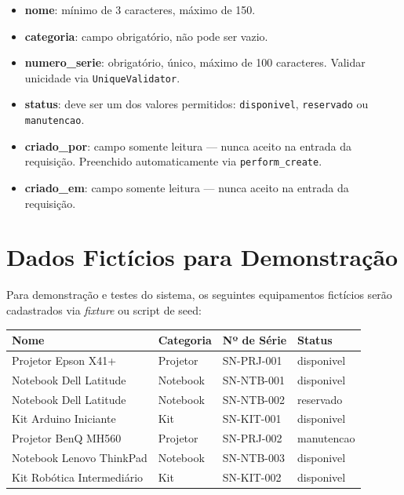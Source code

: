 \documentclass[12pt,a4paper]{article}
\begin{document}
\begin{itemize}
  \item \textbf{nome}: mínimo de 3 caracteres, máximo de 150.
  \item \textbf{categoria}: campo obrigatório, não pode ser vazio.
  \item \textbf{numero\_serie}: obrigatório, único, máximo de 100 caracteres. Validar
        unicidade via \texttt{UniqueValidator}.
  \item \textbf{status}: deve ser um dos valores permitidos: \texttt{disponivel},
        \texttt{reservado} ou \texttt{manutencao}.
  \item \textbf{criado\_por}: campo somente leitura — nunca aceito na entrada da
        requisição. Preenchido automaticamente via \texttt{perform\_create}.
  \item \textbf{criado\_em}: campo somente leitura — nunca aceito na entrada da
        requisição.
\end{itemize}

\section{Dados Fictícios para Demonstração}

Para demonstração e testes do sistema, os seguintes equipamentos fictícios serão
cadastrados via \textit{fixture} ou script de seed:

\begin{center}
\begin{tabular}{@{}llll@{}}
  \toprule
  \textbf{Nome}              & \textbf{Categoria} & \textbf{Nº de Série} & \textbf{Status} \\
  \midrule
  Projetor Epson X41+        & Projetor           & SN-PRJ-001           & disponivel \\
  Notebook Dell Latitude     & Notebook           & SN-NTB-001           & disponivel \\
  Notebook Dell Latitude     & Notebook           & SN-NTB-002           & reservado  \\
  Kit Arduino Iniciante      & Kit                & SN-KIT-001           & disponivel \\
  Projetor BenQ MH560        & Projetor           & SN-PRJ-002           & manutencao \\
  Notebook Lenovo ThinkPad   & Notebook           & SN-NTB-003           & disponivel \\
  Kit Robótica Intermediário & Kit                & SN-KIT-002           & disponivel \\
  \bottomrule
\end{tabular}
\end{center}
\end{document}
